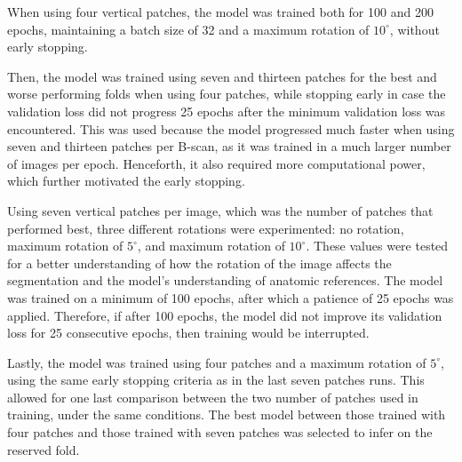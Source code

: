 When using four vertical patches, the model was trained both for 100 and 200 epochs, maintaining a batch size of 32 and a maximum rotation of $10^{\circ}$, without early stopping. 
\par
Then, the model was trained using seven and thirteen patches for the best and worse performing folds when using four patches, while stopping early in case the validation loss did not progress 25 epochs after the minimum validation loss was encountered. This was used because the model progressed much faster when using seven and thirteen patches per B-scan, as it was trained in a much larger number of images per epoch. Henceforth, it also required more computational power, which further motivated the early stopping.
\par
Using seven vertical patches per image, which was the number of patches that performed best, three different rotations were experimented: no rotation, maximum rotation of $5^{\circ}$, and maximum rotation of $10^{\circ}$. These values were tested for a better understanding of how the rotation of the image affects the segmentation and the model's understanding of anatomic references. The model was trained on a minimum of 100 epochs, after which a patience of 25 epochs was applied. Therefore, if after 100 epochs, the model did not improve its validation loss for 25 consecutive epochs, then training would be interrupted.
\par
Lastly, the model was trained using four patches and a maximum rotation of $5^{\circ}$, using the same early stopping criteria as in the last seven patches runs. This allowed for one last comparison between the two number of patches used in training, under the same conditions. The best model between those trained with four patches and those trained with seven patches was selected to infer on the reserved fold.

